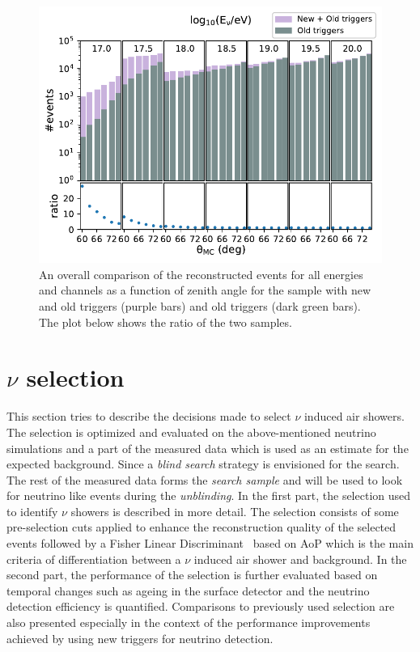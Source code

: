 \begin{figure}[h!]
  \centering
  \includegraphics[width=14.5cm]{thesis_figures/Nu_analysis/MC_control/Events_vs_angle_summary_new.pdf}
  \caption{An overall comparison of the reconstructed events for all energies and channels as a function of zenith angle for the sample with new and old triggers (purple bars) and old triggers (dark green bars). The plot below shows the ratio of the two samples.}
  \label{fig:Events_vs_angle_summary}
\end{figure}


\section{\texorpdfstring{$\nu$}{} selection}
\label{sec:nu_sel}
This section tries to describe the decisions made to select $\nu$ induced air showers. The selection is optimized and evaluated on the above-mentioned neutrino simulations and a part of the measured data which is used as an estimate for the expected background. Since a \textit{blind search} strategy is envisioned for the search. The rest of the measured data forms the \textit{search sample} and will be used to look for neutrino like events during the \textit{unblinding}. 
In the first part, the selection used to identify $\nu$ showers is described in more detail. The selection consists of some pre-selection cuts applied to enhance the reconstruction quality of the selected events followed by a Fisher Linear Discriminant~\cite{Fisher_illustrative} based on AoP which is the main criteria of differentiation between a $\nu$ induced air shower and background.  
In the second part, the performance of the selection is further evaluated based on temporal changes such as ageing in the surface detector and the neutrino detection efficiency is quantified. Comparisons to previously used selection are also presented especially in the context of the performance improvements achieved by using new triggers for neutrino detection.

